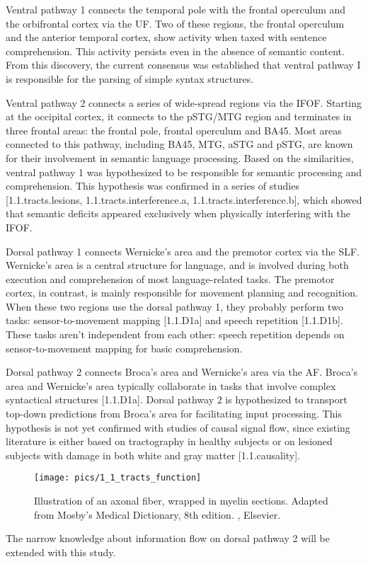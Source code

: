Ventral pathway 1 connects the temporal pole with the frontal operculum and the orbifrontal cortex via the UF.
Two of these regions, the frontal operculum and the anterior temporal cortex, show activity when taxed with sentence comprehension.
This activity persists even in the absence of semantic content.
From this discovery, the current consensus was established that ventral pathway I is responsible for the parsing of simple syntax structures.

Ventral pathway 2 connects a series of wide-spread regions via the IFOF.
Starting at the occipital cortex, it connects to the pSTG/MTG region and terminates in three frontal areas: the frontal pole, frontal operculum and BA45.
Most areas connected to this pathway, including BA45, MTG, aSTG and pSTG, are known for their involvement in semantic language processing.
Based on the similarities, ventral pathway 1 was hypothesized to be responsible for semantic processing and comprehension.
This hypothesis was confirmed in a series of studies [1.1.tracts.lesions, 1.1.tracts.interference.a, 1.1.tracts.interference.b], which showed that semantic deficits appeared exclusively when physically interfering with the IFOF.

Dorsal pathway 1 connects Wernicke's area and the premotor cortex via the SLF.
Wernicke's area is a central structure for language, and is involved during both execution and comprehension of most language-related tasks.
The premotor cortex, in contrast, is mainly responsible for movement planning and recognition.
When these two regions use the dorsal pathway 1, they probably perform two tasks: sensor-to-movement mapping [1.1.D1a] and speech repetition [1.1.D1b].
These tasks aren't independent from each other: speech repetition depends on sensor-to-movement mapping for basic comprehension.

Dorsal pathway 2 connects Broca's area and Wernicke's area via the AF.
Broca's area and Wernicke's area typically collaborate in tasks that involve complex syntactical structures [1.1.D1a].
Dorsal pathway 2 is hypothesized to transport top-down predictions from Broca's area for facilitating input processing.
This hypothesis is not yet confirmed with studies of causal signal flow, since existing literature is either based on tractography in healthy subjects or on lesioned subjects with damage in both white and gray matter [1.1.causality].

\begin{figure}[h]
\begin{center}
\vspace{7mm}
\texttt{[image: pics/1\_1\_tracts\_function]}
\caption{\label{1.1.neuron.illustrated} Illustration of an axonal fiber, wrapped in myelin sections. Adapted from Mosby's Medical Dictionary, 8th edition. , Elsevier.}
\end{center}
\end{figure}

The narrow knowledge about information flow on dorsal pathway 2 will be extended with this study.